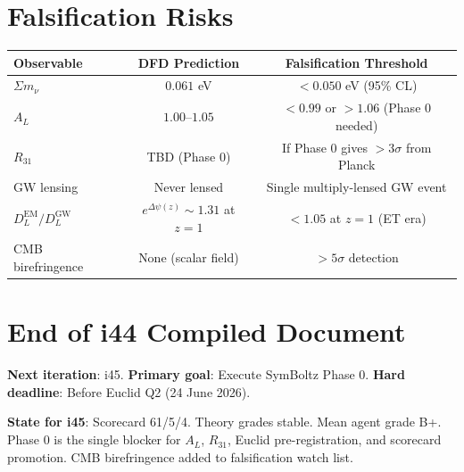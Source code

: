 \documentclass[11pt,a4paper]{article}
\begin{document}
\section{Falsification Risks}

\begin{center}
\begin{tabular}{lcc}
\toprule
\textbf{Observable} & \textbf{DFD Prediction} & \textbf{Falsification Threshold} \\
\midrule
$\Sigma m_\nu$ & $0.061$ eV & $< 0.050$ eV (95\% CL) \\
$A_L$ & $1.00$--$1.05$ & $< 0.99$ or $> 1.06$ (Phase 0 needed) \\
$R_{31}$ & TBD (Phase 0) & If Phase 0 gives $> 3\sigma$ from Planck \\
GW lensing & Never lensed & Single multiply-lensed GW event \\
$D_L^{\text{EM}}/D_L^{\text{GW}}$ & $e^{\Delta\psi(z)} \sim 1.31$ at $z=1$ & $< 1.05$ at $z = 1$ (ET era) \\
CMB birefringence & None (scalar field) & $> 5\sigma$ detection \\
\bottomrule
\end{tabular}
\end{center}


\section*{End of i44 Compiled Document}

\textbf{Next iteration}: i45. \textbf{Primary goal}: Execute SymBoltz Phase 0. \textbf{Hard deadline}: Before Euclid Q2 (24 June 2026).

\textbf{State for i45}: Scorecard 61/5/4. Theory grades stable. Mean agent grade B+. Phase 0 is the single blocker for $A_L$, $R_{31}$, Euclid pre-registration, and scorecard promotion. CMB birefringence added to falsification watch list.
\end{document}
